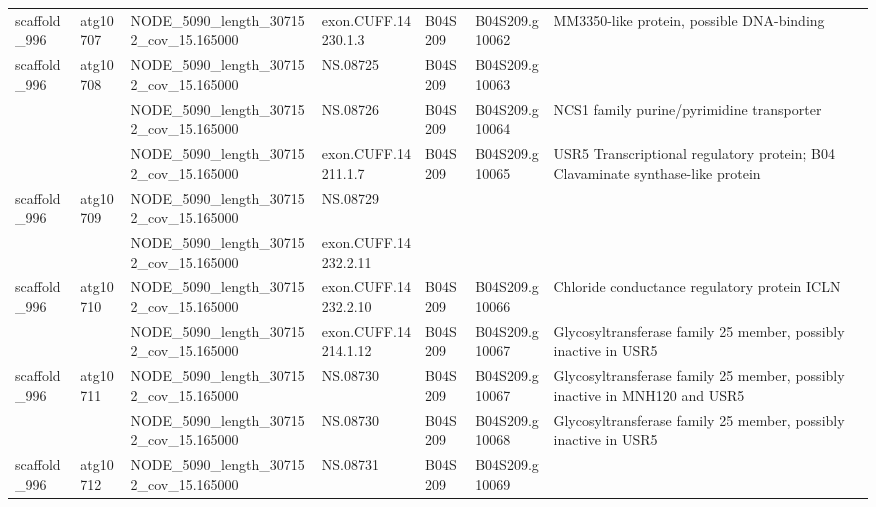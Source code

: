 \begin{longtable}{lllllll}
   scaffold\_996 &  atg10707 &   NODE\_5090\_length\_307152\_cov\_15.165000 &   exon.CUFF.14230.1.3 &      B04S209 &  B04S209.g10062 &                                       MM3350-like protein, possible DNA-binding \\
   scaffold\_996 &  atg10708 &   NODE\_5090\_length\_307152\_cov\_15.165000 &              NS.08725 &      B04S209 &  B04S209.g10063 &                                                                                 \\
                &           &   NODE\_5090\_length\_307152\_cov\_15.165000 &              NS.08726 &      B04S209 &  B04S209.g10064 &                                       NCS1 family purine/pyrimidine transporter \\
                &           &   NODE\_5090\_length\_307152\_cov\_15.165000 &   exon.CUFF.14211.1.7 &      B04S209 &  B04S209.g10065 &   USR5 Transcriptional regulatory protein; B04 Clavaminate synthase-like protein \\
   scaffold\_996 &  atg10709 &   NODE\_5090\_length\_307152\_cov\_15.165000 &              NS.08729 &              &                 &                                                                                 \\
                &           &   NODE\_5090\_length\_307152\_cov\_15.165000 &  exon.CUFF.14232.2.11 &              &                 &                                                                                 \\
   scaffold\_996 &  atg10710 &   NODE\_5090\_length\_307152\_cov\_15.165000 &  exon.CUFF.14232.2.10 &      B04S209 &  B04S209.g10066 &                                    Chloride conductance regulatory protein ICLN \\
                &           &   NODE\_5090\_length\_307152\_cov\_15.165000 &  exon.CUFF.14214.1.12 &      B04S209 &  B04S209.g10067 &                  Glycosyltransferase family 25 member, possibly inactive in USR5 \\
   scaffold\_996 &  atg10711 &   NODE\_5090\_length\_307152\_cov\_15.165000 &              NS.08730 &      B04S209 &  B04S209.g10067 &      Glycosyltransferase family 25 member, possibly inactive in MNH120 and USR5 \\
                &           &   NODE\_5090\_length\_307152\_cov\_15.165000 &              NS.08730 &      B04S209 &  B04S209.g10068 &                  Glycosyltransferase family 25 member, possibly inactive in USR5 \\
   scaffold\_996 &  atg10712 &   NODE\_5090\_length\_307152\_cov\_15.165000 &              NS.08731 &      B04S209 &  B04S209.g10069 &                                                                                 \\

\end{longtable}
